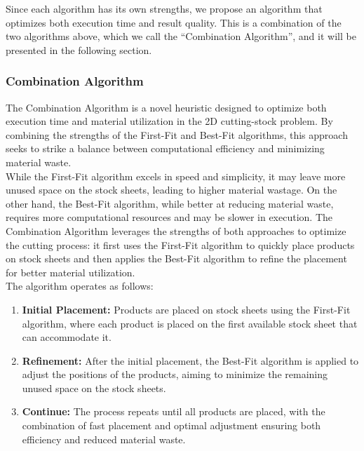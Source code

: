 \documentclass[a4paper]{article}
\begin{document}
    \vspace{0.2cm}
    Since each algorithm has its own strengths, we propose an algorithm that optimizes both execution time and result quality. This is a combination of the two algorithms above, which we call the ``Combination Algorithm'', and it will be presented in the following section.

    \subsubsection{Combination Algorithm}
    The Combination Algorithm is a novel heuristic designed to optimize both execution time and material utilization in the 2D cutting-stock problem. By combining the strengths of the First-Fit and Best-Fit algorithms, this approach seeks to strike a balance between computational efficiency and minimizing material waste.
    \vspace{0.2cm}\\
    While the First-Fit algorithm excels in speed and simplicity, it may leave more unused space on the stock sheets, leading to higher material wastage. On the other hand, the Best-Fit algorithm, while better at reducing material waste, requires more computational resources and may be slower in execution. The Combination Algorithm leverages the strengths of both approaches to optimize the cutting process: it first uses the First-Fit algorithm to quickly place products on stock sheets and then applies the Best-Fit algorithm to refine the placement for better material utilization.
    \vspace{0.2cm}\\
    The algorithm operates as follows: 
    \begin{enumerate} 
        \item \textbf{Initial Placement:} Products are placed on stock sheets using the First-Fit algorithm, where each product is placed on the first available stock sheet that can accommodate it. 
        \item \textbf{Refinement:} After the initial placement, the Best-Fit algorithm is applied to adjust the positions of the products, aiming to minimize the remaining unused space on the stock sheets. 
        \item \textbf{Continue:} The process repeats until all products are placed, with the combination of fast placement and optimal adjustment ensuring both efficiency and reduced material waste. 
    \end{enumerate}
    \vspace{0.2cm}
\end{document}
